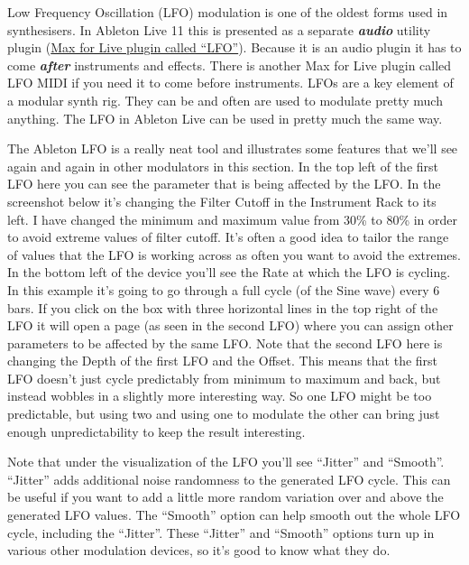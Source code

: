 \documentclass[
  12pt,
  letterpaper,
  oneside,
  open=any]{scrbook}
\makeatletter
\newcommand*\pandocbounded[1]{%
  \sbox\pandoc@box{#1}%
  \Gscale@div\@tempa{\textheight}{\dimexpr\ht\pandoc@box+\dp\pandoc@box\relax}%
  \Gscale@div\@tempb{\linewidth}{\wd\pandoc@box}%
  \ifdim\@tempb\p@<\@tempa\p@\let\@tempa\@tempb\fi%
  \ifdim\@tempa\p@<\p@\scalebox{\@tempa}{\usebox\pandoc@box}%
  \else\usebox{\pandoc@box}%
  \fi%
}
\makeatother
\begin{document}
Low Frequency Oscillation (LFO) modulation is one of the oldest forms
used in synthesisers. In Ableton Live 11 this is presented as a separate
\textbf{\emph{audio}} utility plugin
(\href{https://www.ableton.com/en/live-manual/11/max-for-live-devices/\#lfo}{Max
for Live plugin called ``LFO''}). Because it is an audio plugin it has
to come \textbf{\emph{after}} instruments and effects. There is another
Max for Live plugin called LFO MIDI if you need it to come before
instruments. LFOs are a key element of a modular synth rig. They can be
and often are used to modulate pretty much anything. The LFO in Ableton
Live can be used in pretty much the same way.

The Ableton LFO is a really neat tool and illustrates some features that
we'll see again and again in other modulators in this section. In the
top left of the first LFO here you can see the parameter that is being
affected by the LFO. In the screenshot below it's changing the Filter
Cutoff in the Instrument Rack to its left. I have changed the minimum
and maximum value from 30\% to 80\% in order to avoid extreme values of
filter cutoff. It's often a good idea to tailor the range of values that
the LFO is working across as often you want to avoid the extremes. In
the bottom left of the device you'll see the Rate at which the LFO is
cycling. In this example it's going to go through a full cycle (of the
Sine wave) every 6 bars. If you click on the box with three horizontal
lines in the top right of the LFO it will open a page (as seen in the
second LFO) where you can assign other parameters to be affected by the
same LFO. Note that the second LFO here is changing the Depth of the
first LFO and the Offset. This means that the first LFO doesn't just
cycle predictably from minimum to maximum and back, but instead wobbles
in a slightly more interesting way. So one LFO might be too predictable,
but using two and using one to modulate the other can bring just enough
unpredictability to keep the result interesting.

\pandocbounded{\texttt{[image: images/LFO.png]}}

Note that under the visualization of the LFO you'll see ``Jitter'' and
``Smooth''. ``Jitter'' adds additional noise randomness to the generated
LFO cycle. This can be useful if you want to add a little more random
variation over and above the generated LFO values. The ``Smooth'' option
can help smooth out the whole LFO cycle, including the ``Jitter''. These
``Jitter'' and ``Smooth'' options turn up in various other modulation
devices, so it's good to know what they do.
\end{document}
